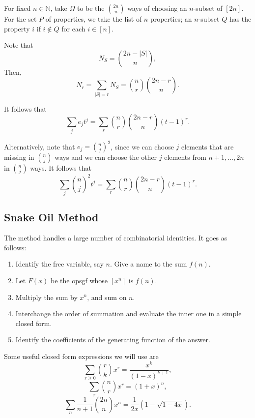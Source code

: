 \documentclass[11pt]{article}
\newcommand{\N}{\mathbb{N}}
\renewcommand{\>}{\rangle}
\newcommand{\<}{\langle}
\begin{document}
\begin{example} For fixed $n \in \N$, take $\Omega$ to be the $\binom{2n}{n}$ ways of choosing an $n$-subset of $[2n]$.  For the set $P$ of properties, we take the list of $n$ properties; an $n$-subset $Q$ has the property $i$ if $i \not \in Q$ for each $i \in [n]$.

Note that 
$$N_S = \binom{2n - |S|}{n},$$
Then,
$$N_r = \sum_{|S| = r} N_S = \binom{n}{r} \binom{2n-r}{n}.$$

It follows that 
$$\sum_j e_j t^j = \sum_{r} \binom{n}{r} \binom{2n-r}{n} (t-1)^r.$$

Alternatively, note that $e_j = \binom{n}{j}^2$, since we can choose $j$ elements that are missing in $\binom{n}{j}$ ways and we can choose the other $j$ elements from $n+1, \dots, 2n$ in $\binom{n}{j}$ ways.  It follows that 
$$\sum_j \binom{n}{j}^2 t^j = \sum_r \binom{n}{r} \binom{2n-r}{n} (t-1)^r.$$
\end{example}

\subsection{Snake Oil Method}
The method handles a large number of combinatorial identities.  It goes as follows:
\begin{enumerate}
\item Identify the free variable, say $n$.  Give a name to the sum $f(n)$.
\item Let $F(x)$ be the opsgf whose $[x^n]$ is $f(n)$.
\item Multiply the sum by $x^n$, and sum on $n$.
\item Interchange the order of summation and evaluate the inner one in a simple closed form.
\item Identify the coefficients of the generating function of the answer.  
\end{enumerate}

Some useful closed form expressions we will use are 
$$\sum_{r \ge 0} \binom{r}{k} x^r = \frac{x^k}{(1-x)^{k+1}},$$
$$\sum_r \binom{n}{r} x^r = (1 + x)^n,$$
$$\sum_n \frac{1}{n+1} \binom{2n}{n} x^n = \frac{1}{2x} (1 - \sqrt{1 - 4x}).$$
\end{document}
